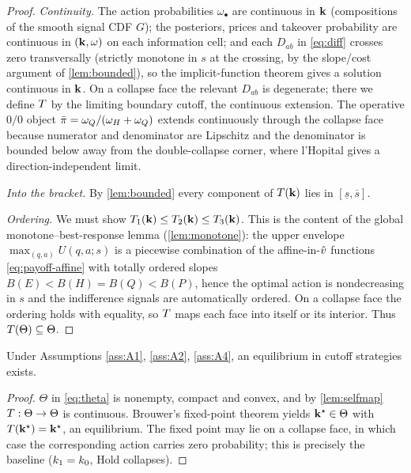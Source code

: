 \begin{proof}
\emph{Continuity.} The action probabilities $\omega_\bullet$ are continuous in
$\mathbf{k}$ (compositions of the smooth signal CDF $G$); the posteriors, prices and
takeover probability are continuous in $(\mathbf{k},\omega)$ on each information cell;
and each $D_{ab}$ in \eqref{eq:diff} crosses zero transversally (strictly
monotone in $s$ at the crossing, by the slope/cost argument of
\ref{lem:bounded}), so the implicit-function theorem gives a solution continuous
in $\mathbf{k}$. On a collapse face the relevant $D_{ab}$ is degenerate; there we
define $T$ by the limiting boundary cutoff, the continuous extension. The
operative $0/0$ object $\bar{\pi}=\omega_Q/(\omega_H+\omega_Q)$ extends continuously
through the collapse face because numerator and denominator are Lipschitz and the
denominator is bounded below away from the double-collapse corner, where
l'Hopital gives a direction-independent limit.

\emph{Into the bracket.} By \ref{lem:bounded} every component of $T(\mathbf{k})$
lies in $[\underline{s},\overline{s}]$.

\emph{Ordering.} We must show
$T_1(\mathbf{k})\le T_2(\mathbf{k})\le T_3(\mathbf{k})$. This is the content of the
global monotone--best-response lemma (\ref{lem:monotone}): the upper envelope
$\max_{(q,a)}U(q,a;s)$ is a piecewise combination of the affine-in-$\hat{v}$
functions \eqref{eq:payoff-affine} with totally ordered slopes
$B(E)<B(H)=B(Q)<B(P)$, hence the optimal action is nondecreasing in $s$ and the
indifference signals are automatically ordered. On a collapse face the ordering
holds with equality, so $T$ maps each face into itself or its interior. Thus
$T(\Theta)\subseteq\Theta$.
\end{proof}

\begin{proposition}[Existence]
\label{prop:existence-new}
Under Assumptions \ref{ass:A1}, \ref{ass:A2}, \ref{ass:A4}, an equilibrium in
cutoff strategies exists.
\end{proposition}

\begin{proof}
$\Theta$ in \eqref{eq:theta} is nonempty, compact and convex, and by
\ref{lem:selfmap} $T:\Theta\to\Theta$ is continuous. Brouwer's fixed-point
theorem yields $\mathbf{k}^\star\in\Theta$ with $T(\mathbf{k}^\star)=\mathbf{k}^\star$, an
equilibrium. The fixed point may lie on a collapse face, in which case the
corresponding action carries zero probability; this is precisely the baseline
($k_1=k_0$, Hold collapses).
\end{proof}

